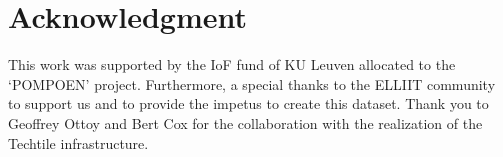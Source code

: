 \documentclass[conference]{IEEEtran}
\begin{document}








\section*{Acknowledgment}
This work was supported by the IoF fund of KU Leuven allocated to the `POMPOEN' project. Furthermore, a special thanks to the ELLIIT community to support us and to provide the impetus to create this dataset. Thank you to Geoffrey Ottoy and Bert Cox for the collaboration with the realization of the Techtile infrastructure.


\printbibliography%
\end{document}
